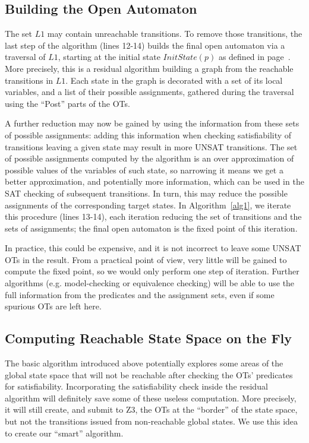\documentclass[smallcondensed]{svjour3}
\begin{document}
\subsection{Building the Open Automaton}
\label{section:BuildingTheOpenAutomaton}

The set $L1$ may contain unreachable transitions. To remove those
transitions, the last step of the  
algorithm (lines 12-14) builds the final open automaton via a traversal of $L1$,
starting at the initial state $InitState(p)$ as defined in
page~\pageref{def-states}. More precisely, this is a residual
algorithm building a graph from the reachable transitions in $L1$. 
Each state in the graph is decorated with a set of its local
variables, and a list of their possible assignments,
gathered during the traversal using the ``Post'' parts of the
OTs.

A further reduction may now be gained by using the information from
these sets of possible assignments: adding this information when
checking satisfiability of transitions leaving a given state may
result in more UNSAT transitions. The set of possible
assignments computed by the algorithm is an over approximation of
possible values of the 
variables of such state, so narrowing it means we get a better
approximation, and potentially more information, which can be used in
the SAT checking of subsequent transitions. In turn, this may reduce the possible
assignments of the corresponding target states. In
Algorithm~\ref{alg1}, we iterate this procedure (lines 13-14), each iteration
reducing the set of 
transitions and the sets of assignments; the final open automaton
is the fixed point of this iteration.

In practice, this could be
expensive, and it is not incorrect to leave some UNSAT OTs in the
result. From a  practical point of view, very little will be gained to compute the
fixed point, so we would only perform one step of iteration. Further algorithms 
(e.g. model-checking or equivalence checking) will be able to use the
full information from the predicates and the assignment sets, even if
some spurious OTs are left here.

\subsection{Computing Reachable State Space on the Fly}

The basic algorithm introduced above potentially explores some
areas of the global state space that will not be reachable after
checking the OTs' predicates for satisfiability. Incorporating the
satisfiability check inside the residual algorithm will definitely
save some of these useless computation. More precisely, it will still
create, and submit to Z3, the OTs at the ``border'' of the state space, but
not the transitions issued from non-reachable global states. We use
this idea to create our ``smart'' algorithm.
\end{document}
